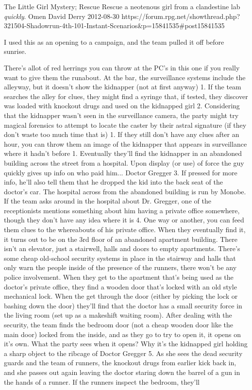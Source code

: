 \begin{scenario}{The Little Girl}
	{Mystery; Rescue}
	{Rescue a neotenous girl from a clandestine lab \emph{quickly}.}
	{Omen David Derry}
	{2012-08-30}
	{https://forum.rpg.net/showthread.php?321504-Shadowrun-4th-101-Instant-Scenarios\&p=15841535\#post15841535}

 I used this as an opening to a campaign, and the team pulled it off before sunrise.


\synopsis  There's allot of red herrings you can throw at the PC's in this one if you really want to give them the runabout. At the bar, the surveillance systems include the alleyway, but it doesn't show the kidnapper (not at first anyway) 1. If the team searches the alley for clues, they might find a syringe that, if tested, they discover was loaded with knockout drugs and used on the kidnapped girl 2. Considering that the kidnapper wasn't seen in the surveillance camera, the party might try magical forensics to attempt to locate the caster by their astral signature (if they don't waste too much time that is) 1. If they still don't have any clues after an hour, you can throw them an image of the kidnapper that appears in surveillance where it hadn't before 1. Eventually they'll find the kidnapper in an abandoned building across the street from a hospital. Upon display (or use) of force the guy quickly gives up info on who paid him... Doctor Gregger 3. If pressed for more info, he'll also tell them that he dropped the kid into the back seat of the doctor's car. The hospital across from the abandoned building is run by Monobe. If the team asks around in the hospital about Dr. Gregger, one of the receptionists mentions something about him having a private office somewhere, though they don't have any idea where it is 4. One way or another, you can feed them clues to the whereabouts of his private office. When they eventually find it, it turns out to be on the 3rd floor of an abandoned apartment building. There isn't an elevator, just a stairwell, halls and doors to empty apartments. There's some cheap old-school security systems in place in the stairway and halls that only warn the people inside of the presence of the runners, there won't be any police involvement. When they get to the apartment that's being used as the doctor's private office, they find a wooden door that's locked with an old style mechanical lock. When the get through the door (either by picking the lock or bashing down the door) they'll find that the doctor has a small security force in the living room (set up as a makeshift waiting room). After dealing with the security, the team finds the bedroom door (not a cheap wooden door like the main door) locked from the inside, and as they go to try to open it, it opens on it's own. What the party sees when it opens? Why it's the kidnapped girl holding a sharp object to the ribcage of Doctor Gregger 5. As she sees the dead security guards and the team of runners, the knockout drugs from earlier kick back in, and she passes out again leaving the doctor staring down the barrel of a gun in the hands of a runner. If the runners inspect the bedroom, they'll 
\end{scenario}

